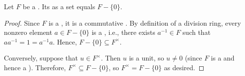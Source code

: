 \begin{lemma} \label{lemma:unit_group_of_a_field_just_excludes_zero}
    Let $F$ be a . Its  as a set equals $F - \{0\}$.
\end{lemma}

\begin{proof}
    Since $F$ is a , it is a commutative . By definition of a division ring, every nonzero element $a \in F - \{0\}$ is a , i.e., there exists $a^{-1} \in F$ such that $a a^{-1} = 1 = a^{-1} a$. Hence, $F - \{0\} \subseteq F^\times$.

    Conversely, suppose that $u \in F^\times$. Then $u$ is a unit, so $u \neq 0$ (since $F$ is a  and hence a ). Therefore, $F^\times \subseteq F - \{0\}$, so $F^\times = F - \{0\}$ as desired.
\end{proof}